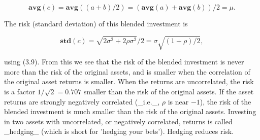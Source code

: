 \[\mathbf{avg}(c)=\mathbf{avg}((a+b)/2)=(\mathbf{avg}(a)+\mathbf{avg}(b))/2=\mu.\]

The risk (standard deviation) of this blended investment is

\[\mathbf{std}(c)=\sqrt{2\sigma^{2}+2\rho\sigma^{2}}/2=\sigma\sqrt{(1+\rho)/2},\]

using (3.9). From this we see that the risk of the blended investment is never more than the risk of the original assets, and is smaller when the correlation of the original asset returns is smaller. When the returns are uncorrelated, the risk is a factor \(1/\sqrt{2}=0.707\) smaller than the risk of the original assets. If the asset returns are strongly negatively correlated (_i.e._, \(\rho\) is near \(-1\)), the risk of the blended investment is much smaller than the risk of the original assets. Investing in two assets with uncorrelated, or negatively correlated, returns is called _hedging_ (which is short for 'hedging your bets'). Hedging reduces risk.

 